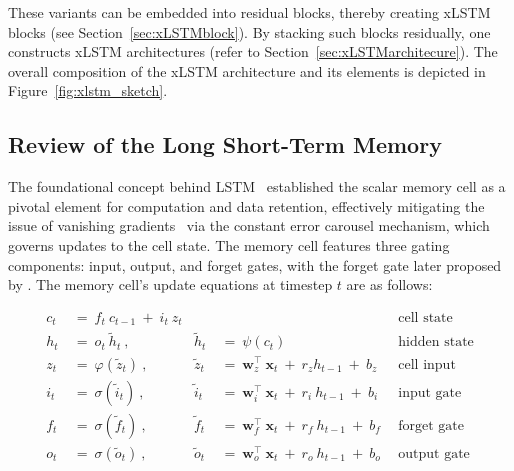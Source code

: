 These variants can be embedded into residual blocks, thereby creating xLSTM blocks (see Section~\ref{sec:xLSTMblock}). By stacking such blocks residually, one constructs xLSTM architectures (refer to Section~\ref{sec:xLSTMarchitecure}). The overall composition of the xLSTM architecture and its elements is depicted in Figure~\ref{fig:xlstm_sketch}.

\subsection{Review of the Long Short-Term Memory}
\label{sec:orgLSTM}

The foundational concept behind LSTM~\citep{Hochreiter:91,Hochreiter:97nips,Hochreiter:97} established the scalar memory cell as a pivotal element for computation and data retention, effectively mitigating the issue of vanishing gradients~\citep{Hochreiter:91,Hochreiter:00book} via the constant error carousel mechanism, which governs updates to the cell state. The memory cell features three gating components: input, output, and forget gates, with the forget gate later proposed by \citet{Gers:00}. The memory cell’s update equations at timestep $t$ are as follows:

\begin{align}
c_t \ &= \  f_t \ c_{t-1} \ + \ i_t \ z_t &  & &\text{cell state} \\
h_t  \ &= \ o_t \ \tilde{h}_t \ , & \tilde{h}_t \ &= \ \psi \left( c_t\right)
  &\text{hidden state} \\
z_t \ &= \ \varphi \left( \tilde{z}_t \right) \ , 
  &\tilde{z}_t \ &=  \ \mathbf{w}^\top_{z} \ \mathbf{x}_t \ + \
  r_{z}  h_{t-1} \ + \  b_{z} \ \
  &\text{cell input} \\
i_t \ &= \ \sigma \left( \tilde{i}_t  \right) \ , 
  &\tilde{i}_t \ &= \ \mathbf{w}^\top_{i} \ \mathbf{x}_t \ + \
  r_{i}  \ h_{t-1} \ + \  b_{i} \ \
  &\text{input gate} \\
f_t \ &= \ \sigma \left(  \tilde{f}_t \right) \ , 
  &\tilde{f}_t \ &= \ \mathbf{w}^\top_{f} \ \mathbf{x}_t  \ + \
  r_{f}  \ h_{t-1} \ + \  b_{f} \ \
  &\text{forget gate} \\
o_t \ &= \ \sigma \left( \tilde{o}_t \right) \ , 
  &\tilde{o}_t  \ &= \ \mathbf{w}^\top_{o} \ \mathbf{x}_t \ + \
  r_{o}  \ h_{t-1} \ + \  b_{o} \ \
  &\text{output gate} 
\end{align}

